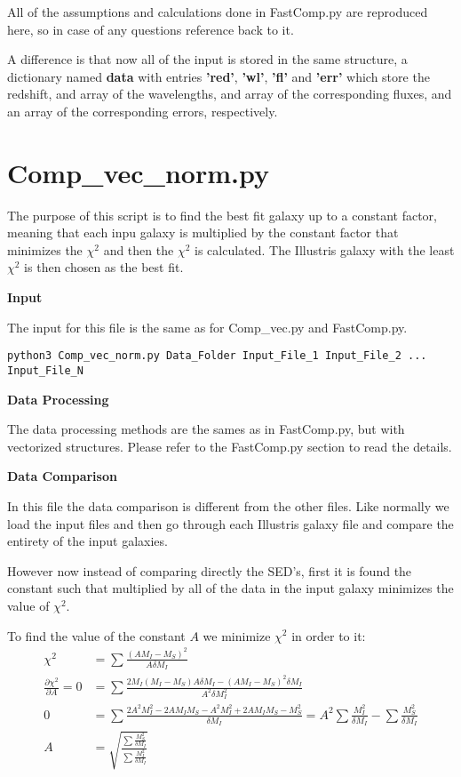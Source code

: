 \documentclass[11pt]{article}
\begin{document}
All of the assumptions and calculations done in FastComp.py are reproduced here, so in case of any questions reference back to it.

A difference is that now all of the input is stored in the same structure, a dictionary named {\bf data} with entries {\bf 'red'}, {\bf 'wl'}, {\bf 'fl'} and {\bf 'err'} which store the redshift, and array of the wavelengths, and array of the corresponding fluxes, and an array of the corresponding errors, respectively.

\newpage


\section{Comp\_vec\_norm.py}

The purpose of this script is to find the best fit galaxy up to a constant factor, meaning that each inpu galaxy is multiplied by the constant factor that minimizes the $\chi^2$ and then the $\chi^2$ is calculated. The Illustris galaxy with the least $\chi^2$ is then chosen as the best fit.

{\bf Input}

The input for this file is the same as for Comp\_vec.py and FastComp.py.

\begin{verbatim}
python3 Comp_vec_norm.py Data_Folder Input_File_1 Input_File_2 ... Input_File_N
\end{verbatim}

{\bf Data Processing}

The data processing methods are the sames as in FastComp.py, but with vectorized structures. Please refer to the FastComp.py section to read the details.

{\bf Data Comparison}

In this file the data comparison is different from the other files. Like normally we load the input files and then go through each Illustris galaxy file and compare the entirety of the input galaxies.

However now instead of comparing directly the SED's, first it is found the constant such that multiplied by all of the data in the input galaxy minimizes the value of $\chi^2$.

To find the value of the constant $A$ we minimize $\chi^2$ in order to it:
\begin{align}
\chi^2 &= \sum \frac{(AM_I - M_S)^2}{A\delta M_I}\\
\frac{\partial \chi^2}{\partial A} = 0 &= \sum \frac{2M_I(M_I-M_S) A\delta M_I - (AM_I - M_S)^2\delta M_I}{A^2\delta M_I^2} \\
0 &= \sum \frac{2A^2M_I^2 - 2AM_IM_S - A^2M_I^2 + 2AM_IM_S - M_S^2}{\delta M_I} = A^2\sum \frac{M_I^2}{\delta M_I} - \sum\frac{M_S^2}{\delta M_I}\\
A &= \sqrt{\frac{ \sum\frac{M_S^2}{\delta M_I}}{\sum \frac{M_I^2}{\delta M_I}}}
\end{align}
\end{document}
